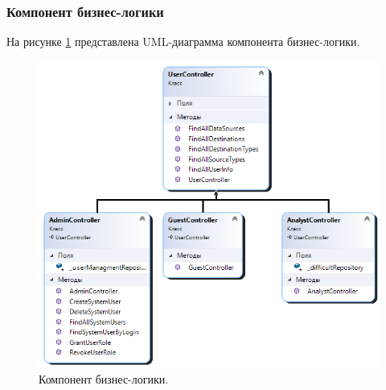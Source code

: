 \subsubsection{Компонент бизнес-логики}
На рисунке \ref{img:Controllers} представлена UML-диаграмма компонента бизнес-логики.
\begin{figure}[H]
	\centering
	\includegraphics[scale=1]{Controllers.png}
	\caption{Компонент бизнес-логики.}
	\label{img:Controllers}
\end{figure}
